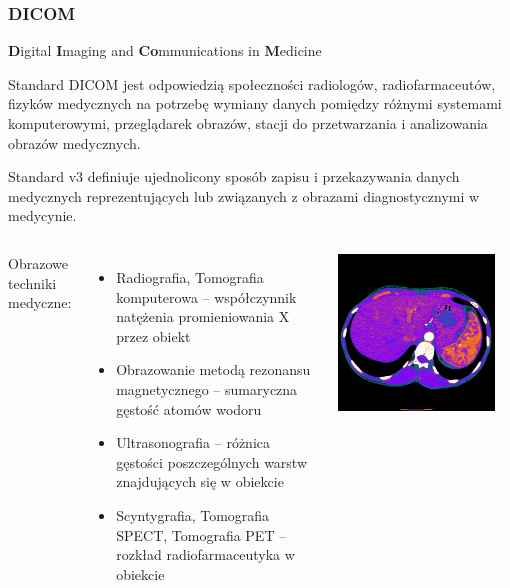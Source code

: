\documentclass[aspectratio=169]{beamer}
\begin{document}
\begin{frame}[t]
    \frametitle{DICOM}
    \normalsize
    \textbf{D}igital \textbf{I}maging and \textbf{Co}mmunications in \textbf{M}edicine

    \vspace{1em}
    \scriptsize
    Standard DICOM jest odpowiedzią społeczności radiologów, radiofarmaceutów, fizyków medycznych na potrzebę wymiany danych pomiędzy różnymi systemami komputerowymi, przeglądarek obrazów, stacji do przetwarzania i analizowania obrazów medycznych.

    \vspace{1em}
    Standard \DICOM v3 definiuje ujednolicony sposób zapisu i przekazywania danych medycznych reprezentujących lub związanych z obrazami diagnostycznymi w medycynie.


    \begin{columns}[T]
        \vspace{1em}
        \normalsize
        \hspace*{0.3em}Obrazowe techniki medyczne:
        \scriptsize
        \begin{itemize}
            \item Radiografia, Tomografia komputerowa -- współczynnik natężenia promieniowania X przez obiekt
            \item Obrazowanie metodą rezonansu magnetycznego -- sumaryczna gęstość atomów wodoru
            \item Ultrasonografia -- różnica gęstości poszczególnych warstw znajdujących się w obiekcie
            \item Scyntygrafia, Tomografia SPECT, Tomografia PET -- rozkład radiofarmaceutyka w obiekcie
        \end{itemize}

        \includegraphics[trim={0 40px 0px 60px},clip,width=0.9\textwidth]{img/windowing.pet.50.350.png}


    \end{columns}
\end{frame}
\end{document}
